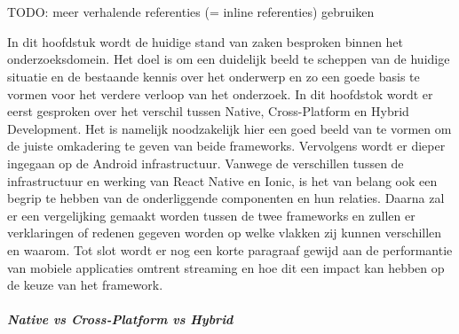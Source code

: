 \chapter{}%
\label{ch:stand-van-zaken}



TODO: meer verhalende referenties (= inline referenties) gebruiken

In dit hoofdstuk wordt de huidige stand van zaken besproken binnen het onderzoeksdomein. Het doel is om een duidelijk beeld te scheppen van de huidige situatie en de bestaande kennis over het onderwerp en zo een goede basis te vormen voor het verdere verloop van het onderzoek. In dit hoofdstok wordt er eerst gesproken over het verschil tussen Native, Cross-Platform en Hybrid Development. Het is namelijk noodzakelijk hier een goed beeld van te vormen om de juiste omkadering te geven van beide frameworks. Vervolgens wordt er dieper ingegaan op de Android infrastructuur. Vanwege de verschillen tussen de infrastructuur en werking van React Native en Ionic, is het van belang ook een begrip te hebben van de onderliggende componenten en hun relaties. Daarna zal er een vergelijking gemaakt worden tussen de twee frameworks en zullen er verklaringen of redenen gegeven worden op welke vlakken zij kunnen verschillen en waarom. Tot slot wordt er nog een korte paragraaf gewijd aan de performantie van mobiele applicaties omtrent streaming en hoe dit een impact kan hebben op de keuze van het framework.

\paragraph{Native vs Cross-Platform vs Hybrid}

